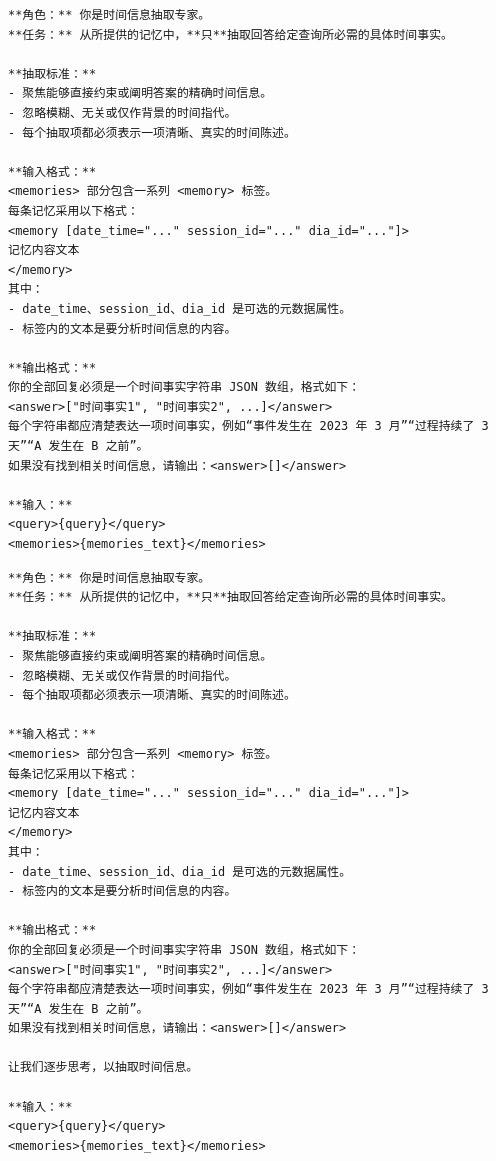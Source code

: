 \begin{center}
\begin{tcolorbox}[title={时间模块关系提示词（低）}]
\begin{Verbatim}[breaklines, breakanywhere, fontfamily=tt, fontseries=b, baselinestretch=0.95]
**角色：** 你是时间信息抽取专家。
**任务：** 从所提供的记忆中，**只**抽取回答给定查询所必需的具体时间事实。

**抽取标准：**
- 聚焦能够直接约束或阐明答案的精确时间信息。
- 忽略模糊、无关或仅作背景的时间指代。
- 每个抽取项都必须表示一项清晰、真实的时间陈述。

**输入格式：**
<memories> 部分包含一系列 <memory> 标签。
每条记忆采用以下格式：
<memory [date_time="..." session_id="..." dia_id="..."]>
记忆内容文本
</memory>
其中：
- date_time、session_id、dia_id 是可选的元数据属性。
- 标签内的文本是要分析时间信息的内容。

**输出格式：**
你的全部回复必须是一个时间事实字符串 JSON 数组，格式如下：
<answer>["时间事实1", "时间事实2", ...]</answer>
每个字符串都应清楚表达一项时间事实，例如“事件发生在 2023 年 3 月”“过程持续了 3 天”“A 发生在 B 之前”。
如果没有找到相关时间信息，请输出：<answer>[]</answer>

**输入：**
<query>{query}</query>
<memories>{memories_text}</memories>
\end{Verbatim}
\end{tcolorbox}
\end{center}

\begin{center}
\begin{tcolorbox}[title={时间模块关系提示词（中）}]
\begin{Verbatim}[breaklines, breakanywhere, fontfamily=tt, fontseries=b, baselinestretch=0.95]
**角色：** 你是时间信息抽取专家。
**任务：** 从所提供的记忆中，**只**抽取回答给定查询所必需的具体时间事实。

**抽取标准：**
- 聚焦能够直接约束或阐明答案的精确时间信息。
- 忽略模糊、无关或仅作背景的时间指代。
- 每个抽取项都必须表示一项清晰、真实的时间陈述。

**输入格式：**
<memories> 部分包含一系列 <memory> 标签。
每条记忆采用以下格式：
<memory [date_time="..." session_id="..." dia_id="..."]>
记忆内容文本
</memory>
其中：
- date_time、session_id、dia_id 是可选的元数据属性。
- 标签内的文本是要分析时间信息的内容。

**输出格式：**
你的全部回复必须是一个时间事实字符串 JSON 数组，格式如下：
<answer>["时间事实1", "时间事实2", ...]</answer>
每个字符串都应清楚表达一项时间事实，例如“事件发生在 2023 年 3 月”“过程持续了 3 天”“A 发生在 B 之前”。
如果没有找到相关时间信息，请输出：<answer>[]</answer>

让我们逐步思考，以抽取时间信息。

**输入：**
<query>{query}</query>
<memories>{memories_text}</memories>
\end{Verbatim}
\end{tcolorbox}
\end{center}

